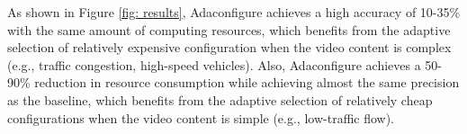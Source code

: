 As shown in Figure \ref{fig: results}, Adaconfigure achieves a high accuracy of 10-35\% with the same amount of computing resources, which benefits from the adaptive selection of relatively expensive configuration when the video content is complex (e.g., traffic congestion, high-speed vehicles). Also, Adaconfigure achieves a 50-90\% reduction in resource consumption while achieving almost the same precision as the baseline, which benefits from the adaptive selection of relatively cheap configurations when the video content is simple (e.g., low-traffic flow).





